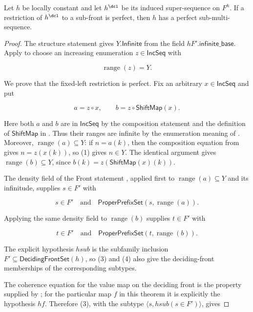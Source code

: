 \begin{lemma}
Let $h$ be locally constant and let $h^{\dcl}$ be its induced
super-sequence on $F^h$.  If a restriction of $h^{\dcl}$ to a sub-front is
perfect, then $h$ has a perfect sub-multi-sequence.
\end{lemma}
\begin{proof}
The structure statement  gives
$Y.\mathsf{Infinite}$ from the field $hF'.\mathsf{infinite\_base}$.
Apply  to choose an increasing enumeration
$z\in\mathsf{IncSeq}$ with

\[
\operatorname{range}(z)=Y.
\tag{1}
\]

We prove that the fixed-left restriction is perfect.  Fix an arbitrary
$x\in\mathsf{IncSeq}$ and put

\[
a=z\circ x,\qquad b=z\circ\mathsf{ShiftMap}(x).
\tag{2}
\]

Here both $a$ and $b$ are in $\mathsf{IncSeq}$ by the composition statement
 and the definition of $\mathsf{ShiftMap}$ in
.  Thus their ranges are infinite by the enumeration
meaning of .  Moreover,
$\operatorname{range}(a)\subseteq Y$: if $n=a(k)$, then the composition
equation from  gives $n=z(x(k))$, so (1) gives $n\in Y$.
The identical argument gives
$\operatorname{range}(b)\subseteq Y$, since $b(k)=z(\mathsf{ShiftMap}(x)(k))$.

The density field of the Front statement , applied first to
$\operatorname{range}(a)\subseteq Y$ and its infinitude, supplies
$s\in F'$ with

\[
s\in F'\quad\text{and}\quad
\mathsf{ProperPrefixSet}(s,\operatorname{range}(a)).
\tag{3}
\]

Applying the same density field to $\operatorname{range}(b)$ supplies
$t\in F'$ with

\[
t\in F'\quad\text{and}\quad
\mathsf{ProperPrefixSet}(t,\operatorname{range}(b)).
\tag{4}
\]

The explicit hypothesis $hsub$ is the subfamily inclusion
$F'\subseteq\mathsf{DecidingFrontSet}(h)$, so (3) and (4) also give the
deciding-front memberships of the corresponding subtypes.

The coherence equation for the value map on the deciding front is the
property supplied by ; for the particular map $f$
in this theorem it is explicitly the hypothesis $hf$.  Therefore (3), with
the subtype $\langle s,hsub(s\in F')\rangle$, gives


\end{proof}
